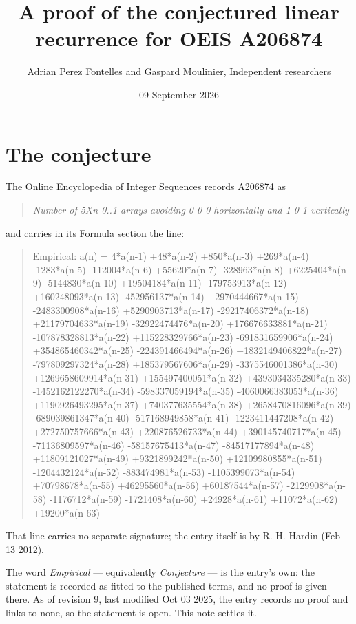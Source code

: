 \documentclass[11pt]{article}
\title{A proof of the conjectured linear recurrence for OEIS A206874}
\author{Adrian Perez Fontelles and Gaspard Moulinier, Independent researchers}
\date{09 September 2026}
\theoremstyle{definition}
\begin{document}
\maketitle
\section{The conjecture}

The Online Encyclopedia of Integer Sequences records \href{https://oeis.org/A206874}{A206874} as

\begin{quote}\itshape Number of 5Xn 0..1 arrays avoiding 0 0 0 horizontally and 1 0 1 vertically\end{quote}

and carries in its Formula section the line:

\begin{quote}\ttfamily Empirical: a(n) = 4*a(n-1) +48*a(n-2) +850*a(n-3) +269*a(n-4) -1283*a(n-5) -112004*a(n-6) +55620*a(n-7) -328963*a(n-8) +6225404*a(n-9) -5144830*a(n-10) +19504184*a(n-11) -179753913*a(n-12) +160248093*a(n-13) -452956137*a(n-14) +2970444667*a(n-15) -2483300908*a(n-16) +5290903713*a(n-17) -29217406372*a(n-18) +21179704633*a(n-19) -32922474476*a(n-20) +176676633881*a(n-21) -107878328813*a(n-22) +115228329766*a(n-23) -691831659906*a(n-24) +354865460342*a(n-25) -224391466494*a(n-26) +1832149406822*a(n-27) -797809297324*a(n-28) +185379567606*a(n-29) -3375546001386*a(n-30) +1269658609914*a(n-31) +155497400051*a(n-32) +4393034335280*a(n-33) -1452162122270*a(n-34) -598337059194*a(n-35) -4060066383053*a(n-36) +1190926493295*a(n-37) +740377635554*a(n-38) +2658470816096*a(n-39) -689039861347*a(n-40) -517168949858*a(n-41) -1223411447208*a(n-42) +272750757666*a(n-43) +220876526733*a(n-44) +390145740717*a(n-45) -71136809597*a(n-46) -58157675413*a(n-47) -84517177894*a(n-48) +11809121027*a(n-49) +9321899242*a(n-50) +12109980855*a(n-51) -1204432124*a(n-52) -883474981*a(n-53) -1105399073*a(n-54) +70798678*a(n-55) +46295560*a(n-56) +60187544*a(n-57) -2129908*a(n-58) -1176712*a(n-59) -1721408*a(n-60) +24928*a(n-61) +11072*a(n-62) +19200*a(n-63)\end{quote}

That line carries no separate signature; the entry itself is by R. H. Hardin (Feb 13 2012).

The word {\itshape Empirical} --- equivalently {\itshape Conjecture} --- is the entry's own: the statement is recorded as fitted to the published terms, and no proof is given there. As of revision 9, last modified Oct 03 2025, the entry records no proof and links to none, so the statement is open. This note settles it.
\end{document}
